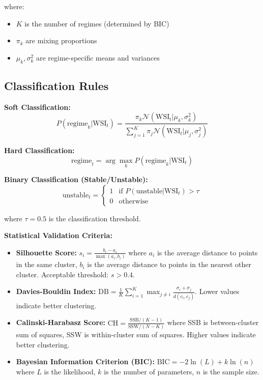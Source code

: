 \documentclass[11pt,a4paper]{article}
\begin{document}
where:
\begin{itemize}
    \item $K$ is the number of regimes (determined by BIC)
    \item $\pi_k$ are mixing proportions
    \item $\mu_k, \sigma_k^2$ are regime-specific means and variances
\end{itemize}

\subsection{Classification Rules}

\textbf{Soft Classification:}
\begin{equation}
P(\text{regime}_k | \text{WSI}_t) = \frac{\pi_k \mathcal{N}(\text{WSI}_t | \mu_k, \sigma_k^2)}{\sum_{j=1}^{K} \pi_j \mathcal{N}(\text{WSI}_t | \mu_j, \sigma_j^2)}
\end{equation}

\textbf{Hard Classification:}
\begin{equation}
\text{regime}_t = \arg\max_k P(\text{regime}_k | \text{WSI}_t)
\end{equation}

\textbf{Binary Classification (Stable/Unstable):}
\begin{equation}
\text{unstable}_t = \begin{cases} 
1 & \text{if } P(\text{unstable} | \text{WSI}_t) > \tau \\
0 & \text{otherwise}
\end{cases}
\end{equation}

where $\tau = 0.5$ is the classification threshold.

\begin{validationbox}
\textbf{Statistical Validation Criteria:}

\begin{itemize}
    \item \textbf{Silhouette Score:} $s_i = \frac{b_i - a_i}{\max(a_i, b_i)}$ where $a_i$ is the average distance to points in the same cluster, $b_i$ is the average distance to points in the nearest other cluster. Acceptable threshold: $s > 0.4$.
    \item \textbf{Davies-Bouldin Index:} $\text{DB} = \frac{1}{K} \sum_{i=1}^{K} \max_{j \neq i} \frac{\sigma_i + \sigma_j}{d(c_i, c_j)}$. Lower values indicate better clustering.
    \item \textbf{Calinski-Harabasz Score:} $\text{CH} = \frac{\text{SSB}/(K-1)}{\text{SSW}/(N-K)}$ where SSB is between-cluster sum of squares, SSW is within-cluster sum of squares. Higher values indicate better clustering.
    \item \textbf{Bayesian Information Criterion (BIC):} $\text{BIC} = -2\ln(L) + k\ln(n)$ where $L$ is the likelihood, $k$ is the number of parameters, $n$ is the sample size.
\end{itemize}
\end{validationbox}
\end{document}
